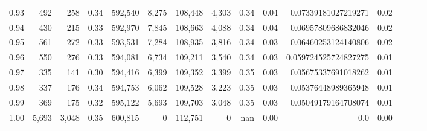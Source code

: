\begin{tabular}{rrrrrrrrrrrrrrr}
0.93 &     492 &    258 &  0.34 &  592,540 &    8,275 &  108,448 &    4,303 &  0.34 &  0.04 &   0.07339181027219271 &      0.02 \\
0.94 &     430 &    215 &  0.33 &  592,970 &    7,845 &  108,663 &    4,088 &  0.34 &  0.04 &   0.06957809686832046 &      0.02 \\
0.95 &     561 &    272 &  0.33 &  593,531 &    7,284 &  108,935 &    3,816 &  0.34 &  0.03 &   0.06460253124140806 &      0.02 \\
0.96 &     550 &    276 &  0.33 &  594,081 &    6,734 &  109,211 &    3,540 &  0.34 &  0.03 &  0.059724525724827275 &      0.01 \\
0.97 &     335 &    141 &  0.30 &  594,416 &    6,399 &  109,352 &    3,399 &  0.35 &  0.03 &   0.05675337691018262 &      0.01 \\
0.98 &     337 &    176 &  0.34 &  594,753 &    6,062 &  109,528 &    3,223 &  0.35 &  0.03 &   0.05376448989365948 &      0.01 \\
0.99 &     369 &    175 &  0.32 &  595,122 &    5,693 &  109,703 &    3,048 &  0.35 &  0.03 &   0.05049179164708074 &      0.01 \\
1.00 &   5,693 &  3,048 &  0.35 &  600,815 &        0 &  112,751 &        0 &   nan &  0.00 &                   0.0 &      0.00 \\
\bottomrule
\end{tabular}
